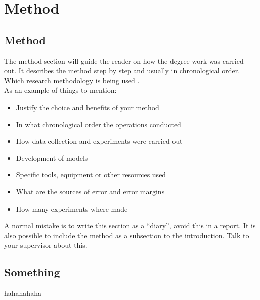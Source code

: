 
\clearpage

\fancyhead{} %

\chapter{Method}\thispagestyle{fancy}

\section{Method}
The method section will guide the reader on how the degree work was carried out. It describes the method step by step and usually in chronological order.  Which research methodology is being used \cite{ResearchMethodology}.\\
As an example of things to mention:
\begin{itemize}
    \item Justify the choice and benefits of your method
    \item In what chronological order the operations conducted
    \item How data collection and experiments were carried out
    \item Development of models
    \item Specific tools, equipment or other resources used
    \item What are the sources of error and error margins 
    \item How many experiments where made
\end{itemize}
A normal mistake is to write this section as a “diary”, avoid this in a report. It is also possible to include the method as a subsection to the introduction. Talk to your supervisor about this.

\begin{comment}
To write notes or comments that isn't published in the pdf.
\end{comment}

\section{Something}
hahahahaha

\begin{comment}
To write notes or comments that isn't published in the pdf.
\end{comment}
